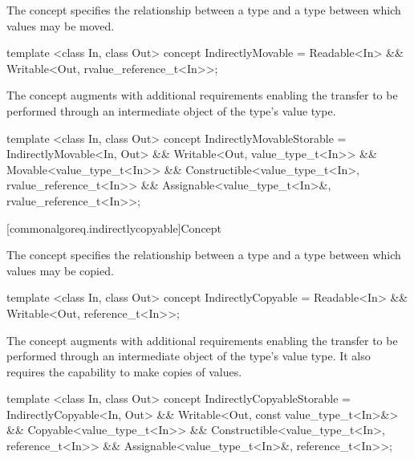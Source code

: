 \pnum
The  concept specifies the relationship between a 
type and a  type between which values may be moved.

%
\begin{codeblock}
  template <class In, class Out>
  concept IndirectlyMovable =
    Readable<In> &&
    Writable<Out, rvalue_reference_t<In>>;
\end{codeblock}

\pnum
The  concept augments  with additional
requirements enabling the transfer to be performed through an intermediate object of the
 type's value type.

%
\begin{codeblock}
  template <class In, class Out>
  concept IndirectlyMovableStorable =
    IndirectlyMovable<In, Out> &&
    Writable<Out, value_type_t<In>> &&
    Movable<value_type_t<In>> &&
    Constructible<value_type_t<In>, rvalue_reference_t<In>> &&
    Assignable<value_type_t<In>&, rvalue_reference_t<In>>;
\end{codeblock}

[commonalgoreq.indirectlycopyable]{Concept }

\pnum
The  concept specifies the relationship between a 
type and a  type between which values may be copied.

%
\begin{codeblock}
  template <class In, class Out>
  concept IndirectlyCopyable =
    Readable<In> &&
    Writable<Out, reference_t<In>>;
\end{codeblock}

\pnum
The  concept augments  with additional
requirements enabling the transfer to be performed through an intermediate object of the
 type's value type. It also requires the capability to make copies of values.

%
\begin{codeblock}
  template <class In, class Out>
  concept IndirectlyCopyableStorable =
    IndirectlyCopyable<In, Out> &&
    Writable<Out, const value_type_t<In>&> &&
    Copyable<value_type_t<In>> &&
    Constructible<value_type_t<In>, reference_t<In>> &&
    Assignable<value_type_t<In>&, reference_t<In>>;
\end{codeblock}

